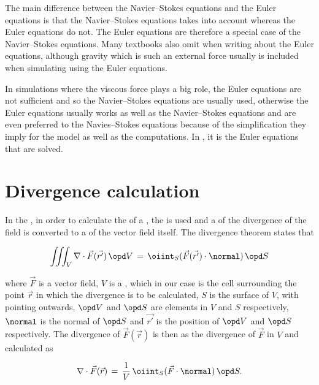 The main difference between the Navier--Stokes equations and the Euler equations is that the Navier--Stokes equations takes  into account whe\-reas the Euler equations do not. The Euler equations are therefore a special case of the Navier--Stokes equations. Many textbooks also omit  when writing about the Euler equations, although gravity which is such an external force usually is included when simulating  using the Euler equations.

In simulations where the viscous force plays a big role, the Euler equations are not sufficient and so the Navier--Stokes equations are usually used, otherwise the Euler equations usually works as well as the Navier--Stokes equations and are even preferred to the Navies--Stokes equations because of the simplification they imply for the model as well as the computations. In \thisprojectwork, it is the Euler equations that are solved.

\section{Divergence calculation}

In the \PDEs, in order to calculate the \divergence of a , the  is used and a  of the divergence of the field is converted to a  of the vector field itself. The divergence theorem states that

\begin{equation} \label{eq:divergence_theorem}
\iiint_V\nabla\cdot\vec{F}(\vec{r'})\,\opd V \,=\, \oiint_S(\vec{F}(\vec{r'})\cdot\normal)\,\opd S
\end{equation}

where $\vec{F}$ is a vector field, $V$ is a , which in our case is the cell surrounding the point $\vec{r}$ in which the divergence is to be calculated, $S$ is the surface of $V$, with  pointing outwards, $\opd V$ and $\opd S$ are \infinitesimal elements in $V$ and $S$ respectively, $\normal$ is the normal of $\opd S$ and $\vec{r'}$ is the position of $\opd V$ and $\opd S$ respectively. The divergence of $\vec{F}(\vec{r})$ is then \approximated as the \average divergence of $\vec{F}$ in $V$ and calculated as

\begin{equation} \label{eq:divergence_surface_integral}
\nabla\cdot\vec{F}(\vec{r}) \,=\, \frac{1}{V}\,\oiint_S(\vec{F}\cdot\normal)\,\opd S.
\end{equation}

